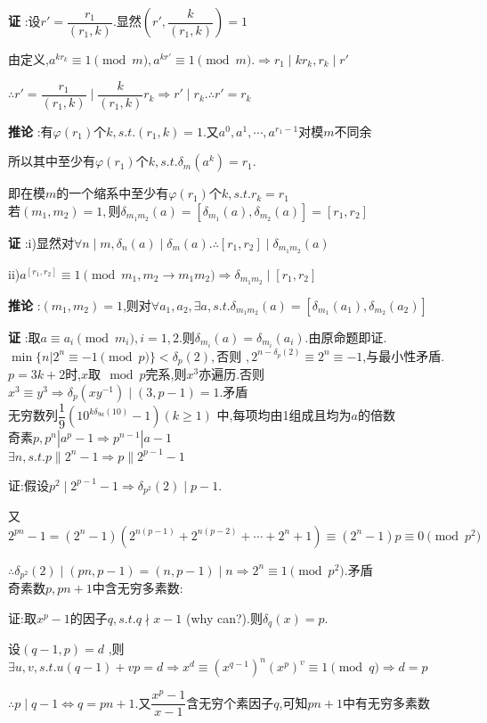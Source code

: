 {\bf 证 }:设$ r'=\dfrac{r_1}{(r_1,k)}$.显然$ (r',\dfrac{k}{(r_1,k)})=1$

由定义,$ a^{kr_k}\equiv 1 \pmod m, a^{kr'}\equiv 1 \pmod m. \Rightarrow  r_1 \mid kr_k,r_k\mid r'$

$ \therefore r' =\dfrac{r_1}{(r_1,k)}\mid \dfrac{k}{(r_1,k)}r_k\Rightarrow r' \mid r_k. \therefore r'=r_k$

{\bf 推论 }:有$ \varphi(r_1)$个$ k,s.t.(r_1,k)=1.$又$ a^0,a^1,\cdots,a^{r_1-1}$对模$ m$不同余

所以其中至少有$ \varphi(r_1)$个$ k,s.t.\delta_m(a^k)=r_1$.

即在模$ m$的一个缩系中至少有$ \varphi(r_1)$个$ k,s.t.r_k=r_1$
\\

若$ (m_1,m_2)=1,$则$ \delta_{m_1m_2}(a)=[\delta_{m_1}(a),\delta_{m_2}(a)]=[r_1,r_2]$

{\bf 证 }:i)显然对$ \forall n \mid m,\delta_n(a)\mid \delta_m(a). \therefore [r_1,r_2] \mid \delta_{m_1m_2}(a)$ 

ii)$ a^{[r_1,r_2]}\equiv 1 \pmod{m_1,m_2 \rightarrow m_1m_2}\Rightarrow \delta_{m_1m_2}\mid [r_1,r_2]$

{\bf 推论 }:$ (m_1,m_2)=1$,则对$ \forall a_1,a_2,\exists a,s.t.\delta_{m_1m_2}(a)=[\delta_{m_1}(a_1),\delta_{m_2}(a_2)]$

{\bf 证 }:取$ a\equiv a_i \pmod{m_i},i=1,2$.则$ \delta_{m_i}(a)=\delta_{m_i}(a_i)$.由原命题即证.
\\

$ \min\{ n|2^n\equiv -1 \pmod p\}<\delta_p(2),$否则 $,2^{n-\delta_p(2)}\equiv 2^n \equiv -1$,与最小性矛盾.
\\

$ p=3k+2$时,$ x$取$ \mod p$完系,则$ x^3$亦遍历.否则$ x^3\equiv y^3\Rightarrow \delta_p(xy^{-1})\mid(3,p-1)=1$.矛盾
\\

无穷数列$  \dfrac{1}{9}(10^{k\delta_{9a}(10)}-1)(k\ge1) $ 中,每项均由1组成且均为$ a$的倍数
\\

奇素$ p,p^n|a^p-1\Rightarrow p^{n-1}|a-1$
\\

$ \exists n,s.t.p\parallel2^n-1\Rightarrow p\parallel 2^{p-1}-1$

证:假设$ p^2 \mid 2^{p-1}-1\Rightarrow \delta_{p^2}(2)\mid p-1.$

又$ 2^{pn}-1=(2^n-1)(2^{n(p-1)}+2^{n(p-2)}+\cdots+2^n+1)\equiv(2^n-1)p\equiv 0\pmod{p^2}$

$ \therefore \delta_{p^2}(2)\mid (pn,p-1)=(n,p-1)\mid n\Rightarrow 2^n\equiv 1 \pmod {p^2}$.矛盾
\\

奇素数$ p,{pn+1}$中含无穷多素数:

证:取$ x^p-1$的因子$ q,s.t.q \nmid x-1$ (why can?).则$ \delta_q(x)=p$.

设$ (q-1,p)=d$ ,则$ \exists u,v,s.t.u(q-1)+vp=d\Rightarrow x^d\equiv(x^{q-1})^n(x^p)^v\equiv 1 \pmod q\Rightarrow d=p$ 

$ \therefore p\mid q-1\Leftrightarrow q=pn+1$.又$ \dfrac{x^p-1}{x-1}$含无穷个素因子$ q$,可知$ {pn+1}$中有无穷多素数
